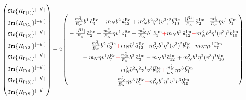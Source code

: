 \documentclass[]{article}
\numberwithin{equation}{section}
\newcommand{\bvec}{b}
\newcommand{\mN}{m_N}
\begin{document}
\begin{align}
    \begin{pmatrix}
        \rule{0pt}{16pt} \mathfrak{Re}\{ R_{\Gamma(1)}\}^{[-b^1]} \\
        \rule{0pt}{16pt} \mathfrak{Im}\{ R_{\Gamma(1)}\}^{[-b^1]} \\
        \rule{0pt}{16pt} \mathfrak{Re}\{ R_{\Gamma(2)}\}^{[-b^1]} \\
        \rule{0pt}{16pt} \mathfrak{Im}\{ R_{\Gamma(2)}\}^{[-b^1]} \\
        \rule{0pt}{16pt} \mathfrak{Re}\{ R_{\Gamma(4)}\}^{[-b^1]} \\
        \rule{0pt}{16pt} \mathfrak{Im}\{ R_{\Gamma(4)}\}^{[-b^1]} \\
        \rule{0pt}{16pt} \mathfrak{Re}\{ R_{\Gamma(8)}\}^{[-b^1]} \\
        \rule{0pt}{16pt} \mathfrak{Im}\{ R_{\Gamma(8)}\}^{[-b^1]}
    \end{pmatrix} &= 2\begin{pmatrix}
     \rule{0pt}{16pt}   \textcolor{red}{-}\frac{\mN^2}{E_N} \bvec^1\, \tilde a^{\text{Re}}_3-  \mN  \bvec^2 \, \tilde a^{\text{Re}}_{12}+  \mN^3  \bvec^2 \eta^2 (v^3)^2 \tilde b^{\text{Re}}_{10} \textcolor{red}{-}\frac{|\vec{P}^1|}{E_N}\, \tilde a^{\text{Im}}_2\textcolor{red}{+} \frac{\mN^2}{E_N} \eta v^1\, \tilde b^{\text{Im}}_1\\
      \rule{0pt}{16pt}  -\frac{|\vec{P}^1|}{E_N}\, \tilde a^{\text{Re}}_2+ \frac{\mN^2}{E_N} \eta v^1\, \tilde b^{\text{Re}}_1 + \frac{\mN^2}{E_N} \bvec^1\, \tilde a^{\text{Im}}_3\textcolor{red}{+} \mN  \bvec^2 \, \tilde a^{\text{Im}}_{12}\textcolor{red}{-} \mN^3  \bvec^2 \eta^2 (v^3)^2 \tilde b^{\text{Im}}_{10}\\
      \rule{0pt}{16pt}  - \frac{\mN^2}{E_N} \bvec^2\, \tilde a^{\text{Re}}_3
		\textcolor{red}{+}  \mN   \bvec^1  \tilde a^{\text{Re}}_{12}\textcolor{red}{-} \mN^3  \bvec^1 \eta^2 (v^3)^2 \tilde b^{\text{Re}}_{10}\textcolor{red}{-}\mN \eta v^1  \tilde b^{\text{Im}}_7 \\
      \rule{0pt}{16pt} - \mN \eta v^1  \tilde b^{\text{Re}}_7 \textcolor{red}{+}  \frac{\mN^2}{E_N} \bvec^2\, \tilde a^{\text{Im}}_3
		- \mN   \bvec^1  \tilde a^{\text{Im}}_{12} +\mN^3  \bvec^1 \eta^2 (v^3)^2 \tilde b^{\text{Im}}_{10}\\
      \rule{0pt}{16pt}-\mN^3 \bvec^2 \eta^2 v^1 v^3\tilde b^{\text{Re}}_{10}\textcolor{red}{+}\frac{\mN^2}{E_N} \eta v^3\, \tilde b^{\text{Im}}_1\\
      \rule{0pt}{16pt} \frac{\mN^2}{E_N} \eta v^3\, \tilde b^{\text{Re}}_1 \textcolor{red}{+} \mN^3 \bvec^2 \eta^2 v^1 v^3\tilde b^{\text{Im}}_{10}\\

\end{pmatrix}
\end{align}
\end{document}
